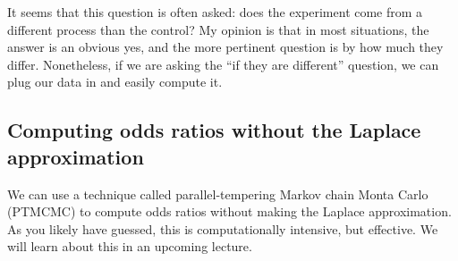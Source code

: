 It seems that this question is often asked: does the experiment come
from a different process than the control?  My opinion is that in most
situations, the answer is an obvious yes, and the more pertinent
question is by how much they differ.  Nonetheless, if we are asking
the ``if they are different'' question, we can plug our data in and
easily compute it.

\subsection{Computing odds ratios without the Laplace approximation}
We can use a technique called parallel-tempering Markov chain Monta Carlo (PTMCMC) to compute odds ratios without making the Laplace approximation. As you likely have guessed, this is computationally intensive, but effective. We will learn about this in an upcoming lecture.
